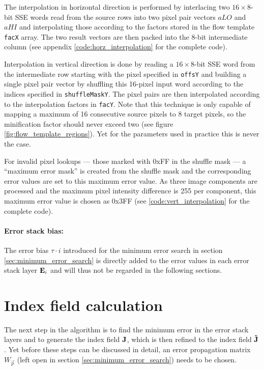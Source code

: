 The interpolation in horizontal direction is performed by interlacing two $16 \times 8$-bit SSE words read from the source rows into two pixel pair vectors $aLO$ and $aHI$ and interpolating those according to the factors stored in the flow template \texttt{facX} array. The two result vectors are then packed into the 8-bit intermediate column (see appendix \ref{code:horz_interpolation} for the complete code).

Interpolation in vertical direction is done by reading a $16 \times 8$-bit SSE word from the intermediate row starting with the pixel specified in \texttt{offsY} and building a single pixel pair vector by shuffling this 16-pixel input word according to the indices specified in \texttt{shuffleMaskY}. The pixel pairs are then interpolated according to the interpolation factors in \texttt{facY}. Note that this technique is only capable of mapping a maximum of 16 consecutive source pixels to 8 target pixels, so the minification factor should never exceed two (see figure \ref{fig:flow_template_regions}). Yet for the parameters used in practice this is never the case.

For invalid pixel lookups --- those marked with 0xFF in the shuffle mask --- a ``maximum error mask'' is created from the shuffle mask and the corresponding error values are set to this maximum error value. As three image components are processed and the maximum pixel intensity difference is 255 per component, this maximum error value is chosen as 0x3FF (see \ref{code:vert_interpolation} for the complete code).

\paragraph{Error stack bias:} The error bias $\tau \cdot i$ introduced for the minimum error search in section \ref{sec:minimum_error_search} is directly added to the error values in each error stack layer $\mathbf{E}_i$ and will thus not be regarded in the following sections.

\section{Index field calculation}

The next step in the algorithm is to find the minimum error in the error stack layers and to generate the index field $\mathbf{J}$, which is then refined to the index field $\mathbf{\tilde J}$. Yet before these steps can be discussed in detail, an error propagation matrix $W_{\vec p}$ (left open in section \ref{sec:minimum_error_search}) needs to be chosen.


